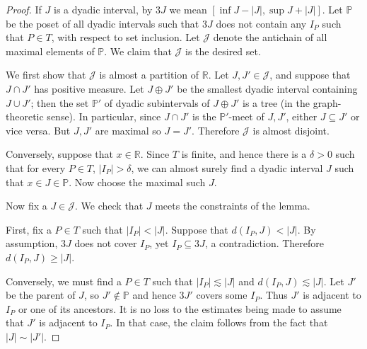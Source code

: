 \documentclass[12pt]{report}
\newcommand{\RR}{\mathbb{R}}
\theoremstyle{definition}
\begin{document}
\begin{proof}
If $J$ is a dyadic interval, by $3J$ we mean $[\inf J - |J|, \sup J + |J|]$.
Let $\mathbb P$ be the poset of all dyadic intervals such that $3J$ does not contain any $I_P$ such that $P \in T$, with respect to set inclusion.
Let $\mathcal J$ denote the antichain of all maximal elements of $\mathbb P$.
We claim that $\mathcal J$ is the desired set.

We first show that $\mathcal J$ is almost a partition of $\RR$.
Let $J, J' \in \mathcal J$, and suppose that $J \cap J'$ has positive measure.
Let $J \oplus J'$ be the smallest dyadic interval containing $J \cup J'$; then the set $\mathbb P'$ of dyadic subintervals of $J \oplus J'$ is a tree (in the graph-theoretic sense).
In particular, since $J \cap J'$ is the $\mathbb P'$-meet of $J, J'$, either $J \subseteq J'$ or vice versa. But $J,J'$ are maximal so $J = J'$. Therefore $\mathcal J$ is almost disjoint.

Conversely, suppose that $x \in \RR$.
Since $T$ is finite, and hence there is a $\delta > 0$ such that for every $P \in T$, $|I_P| > \delta$, we can almost surely find a dyadic interval $J$ such that $x \in J \in \mathbb P$. Now choose the maximal such $J$.

Now fix a $J \in \mathcal J$. We check that $J$ meets the constraints of the lemma.

First, fix a $P \in T$ such that $|I_P| < |J|$.
Suppose that $d(I_P, J) < |J|$. By assumption, $3J$ does not cover $I_P$, yet $I_P \subseteq 3J$, a contradiction. Therefore $d(I_P, J) \geq |J|$.

Conversely, we must find a $P \in T$ such that $|I_P| \lesssim |J|$ and $d(I_P, J) \lesssim |J|$.
Let $J'$ be the parent of $J$, so $J' \notin \mathbb P$ and hence $3J'$ covers some $I_P$. Thus $J'$ is adjacent to $I_P$ or one of its ancestors. It is no loss to the estimates being made to assume that $J'$ is adjacent to $I_P$.
In that case, the claim follows from the fact that $|J| \sim |J'|$.
\end{proof}
\end{document}
